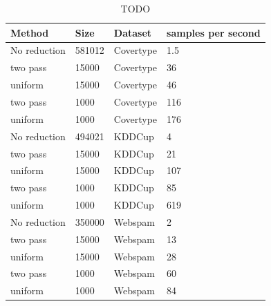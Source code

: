 \begin{table}[ht!]
    \centering
    \begin{tabular}{ l | l| l| l}
        \hline
        \textbf{Method} & \textbf{Size} & \textbf{Dataset} & \textbf{samples per second} \\ \hline
        No reduction    & 581012        & Covertype        & 1.5                         \\ \hline
        two pass        & 15000         & Covertype        & 36                          \\ \hline
        uniform         & 15000         & Covertype        & 46                          \\ \hline
        two pass        & 1000          & Covertype        & 116                         \\ \hline
        uniform         & 1000          & Covertype        & 176                         \\ \hline
        No reduction    & 494021        & KDDCup           & 4                           \\ \hline
        two pass        & 15000         & KDDCup           & 21                          \\ \hline
        uniform         & 15000         & KDDCup           & 107                         \\ \hline
        two pass        & 1000          & KDDCup           & 85                          \\ \hline
        uniform         & 1000          & KDDCup           & 619                         \\ \hline
        No reduction    & 350000        & Webspam          & 2                           \\ \hline
        two pass        & 15000         & Webspam          & 13                          \\ \hline
        uniform         & 15000         & Webspam          & 28                          \\ \hline
        two pass        & 1000          & Webspam          & 60                          \\ \hline
        uniform         & 1000          & Webspam          & 84                          \\ \hline
    \end{tabular}
    \caption{TODO}
    \label{tab:running-times-bayes}
\end{table}
